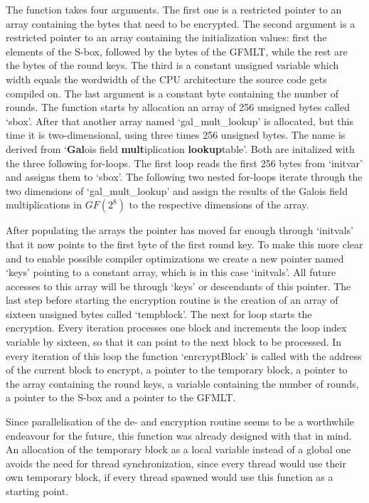 The function takes four arguments. The first one is a restricted pointer
to an array containing the bytes that need to be encrypted. The second
argument is a restricted pointer to an array containing the
initialization values: first the elements of the S-box, followed by the
bytes of the GFMLT, while the rest are the bytes of the round keys. The
third is a constant unsigned variable which width equals the wordwidth
of the CPU architecture the source code gets compiled on. The last
argument is a constant byte containing the number of rounds. The
function starts by allocation an array of 256 unsigned bytes called
`sbox'. After that another array named `gal\_mult\_lookup' is allocated,
but this time it is two-dimensional, using three times 256 unsigned
bytes. The name is derived from `\textbf{Gal}ois field
\textbf{mult}iplication \textbf{lookup}table'. Both are initalized with
the three following for-loops. The first loop reads the first 256 bytes
from `initvar' and assigns them to `sbox'. The following two nested
for-loops iterate through the two dimensions of `gal\_mult\_lookup' and
assign the results of the Galois field multiplications in $GF(2^{8})$ to the
respective dimensions of the array.

After populating the arrays the pointer has moved far enough through
`initvals' that it now points to the first byte of the first round key.
To make this more clear and to enable possible compiler optimizations we
create a new pointer named `keys' pointing to a constant array, which is
in this case `initvals'. All future accesses to this array will be
through `keys' or descendants of this pointer. The last step before
starting the encryption routine is the creation of an array of sixteen
unsigned bytes called `tempblock'. The next for loop starts the
encryption. Every iteration processes one block and increments the loop
index variable by sixteen, so that it can point to the next block to be
processed. In every iteration of this loop the function `enrcryptBlock'
is called with the address of the current block to encrypt, a pointer to
the temporary block, a pointer to the array containing the round keys, a
variable containing the number of rounds, a pointer to the S-box and a
pointer to the GFMLT.

Since parallelisation of the de- and encryption routine seems to be a
worthwhile endeavour for the future, this function was already designed
with that in mind. An allocation of the temporary block as a local
variable instead of a global one avoids the need for thread
synchronization, since every thread would use their own temporary block,
if every thread spawned would use this function as a starting point.

